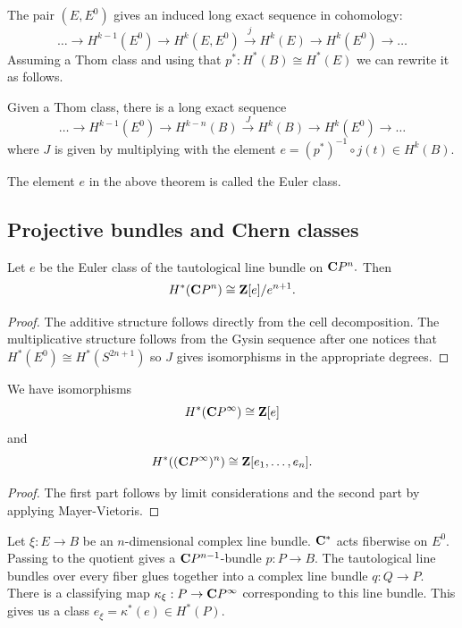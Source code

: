 \documentclass[a4paper,openany]{scrbook}
\begin{document}
The pair $(E,E^0)$ gives an induced long exact sequence in cohomology: $$ \dots \rightarrow H^{k-1}(E^0)\rightarrow H^{k}(E,E^0)\xrightarrow{j} H^k(E)\rightarrow H^k(E^0)\rightarrow \dots $$ Assuming a Thom class and using that $p^*:H^*(B)\cong H^*(E)$ we can rewrite it as follows.

\begin{thm} Given a Thom class, there is a long exact sequence $$ \dots \rightarrow H^{k-1}(E^0)\rightarrow H^{k-n}(B)\xrightarrow{J} H^k(B)\rightarrow H^k(E^0)\rightarrow \dots $$ where $J$ is given by multiplying with the element $e=(p^*)^{-1}\circ j(t)\in H^k(B).$
\end{thm}

\begin{defn}
The element $e$ in the above theorem is called the Euler class.
\end{defn}

\subsection{Projective bundles and Chern classes}


\begin{lemma}
Let $e$ be the Euler class of the tautological line bundle on $\mathbf C P^n.$ Then $$H^*(\mathbf C P^n)\cong \mathbf Z [e]/e^{n+1}.$$
\end{lemma}

\begin{proof}
The additive structure follows directly from the cell decomposition. The multiplicative structure follows from the Gysin sequence after one notices that $H^*(E^0)\cong H^*(S^{2n+1})$ so $J$ gives isomorphisms in the appropriate degrees.
\end{proof}

\begin{corollary}
We have isomorphisms $$H^*(\mathbf C P^\infty)\cong \mathbf Z[e]$$ and $$H^*((\mathbf C P^\infty)^n)\cong \mathbf Z[e_1,\dots,e_n].$$
\end{corollary}

\begin{proof}
The first part follows by limit considerations and the second part by applying Mayer-Vietoris.
\end{proof}


Let $\xi:E\rightarrow B$ be an $n$-dimensional complex line bundle. $\mathbf C^*$ acts fiberwise on $E^0.$ Passing to the quotient gives a $\mathbf C P^{n-1}$-bundle $p:P\rightarrow B.$ The tautological line bundles over every fiber glues together into a complex line bundle $q:Q\rightarrow P.$ There is a classifying map $\kappa_\xi:P\rightarrow \mathbf C P^\infty$ corresponding to this line bundle. This gives us a class $e_\xi =\kappa^*(e)\in H^*(P).$
\end{document}
